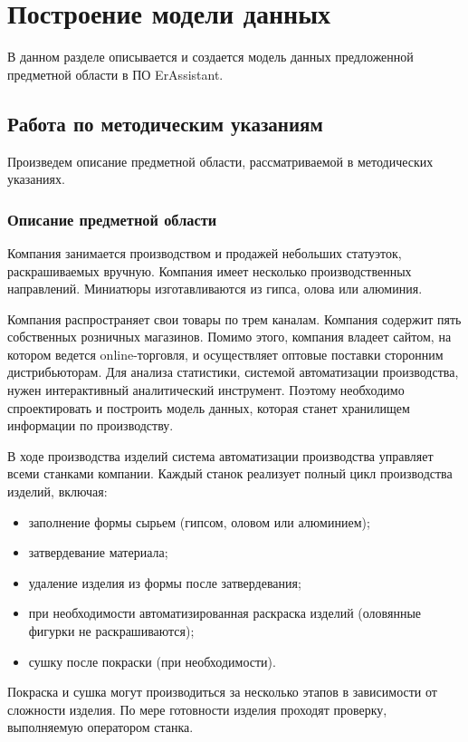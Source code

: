 \newcommand{\erassistant}{ErAssistant~}

\chapter{Построение модели данных}
\label{cha:analysis}
%
%
В данном разделе описывается и создается модель данных предложенной предметной области в ПО ErAssistant.

\section{Работа по методическим указаниям}
Произведем описание предметной области, рассматриваемой в методических указаниях. 
\subsection*{Описание предметной области}
Компания занимается производством и продажей небольших статуэток,
раскрашиваемых вручную. Компания имеет несколько производственных
направлений. Миниатюры изготавливаются из гипса, олова или алюминия.

Компания распространяет свои товары по трем каналам. Компания содержит
пять собственных розничных магазинов. Помимо этого, компания владеет
сайтом, на котором ведется online-торговля, и осуществляет оптовые поставки
сторонним
дистрибьюторам.
Для
анализа
статистики,
системой автоматизации производства, нужен интерактивный аналитический
инструмент. Поэтому необходимо спроектировать и построить модель данных,
которая станет хранилищем информации по производству.

В ходе производства изделий система автоматизации производства
управляет всеми станками компании. Каждый станок реализует полный цикл
производства изделий, включая:
\begin{itemize}
	\item заполнение формы сырьем (гипсом, оловом или алюминием);
	\item затвердевание материала;
	\item  удаление изделия из формы после затвердевания;
	\item при необходимости автоматизированная раскраска изделий (оловянные фигурки не раскрашиваются);
	\item сушку после покраски (при необходимости).
\end{itemize}


Покраска и сушка могут производиться за несколько этапов в зависимости
от сложности изделия. По мере готовности изделия проходят проверку,
выполняемую оператором станка.


